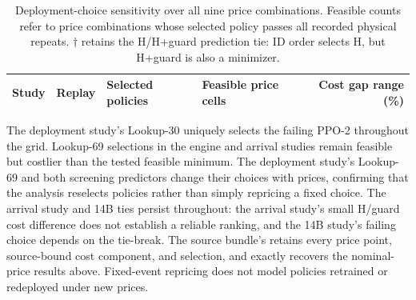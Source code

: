 \begin{table}[t]
\centering
\small
\caption{Deployment-choice sensitivity over all nine price combinations.
Feasible counts refer to price combinations whose selected policy passes all
recorded physical repeats. $\dagger$ retains the H/H+guard prediction tie:
ID order selects H, but H+guard is also a minimizer.}
\label{tab:decisionprice}
\par\vspace{4pt}
\begin{tabular*}{\linewidth}{@{\extracolsep{\fill}}llllr@{}}
\toprule
Study & Replay & Selected policies & Feasible price cells & Cost gap range (\%)\\
\midrule

\end{tabular*}
\end{table}

The deployment study's Lookup-30 uniquely selects the failing PPO-2 throughout the grid. Lookup-69 selections in the engine and arrival studies remain feasible but costlier than the tested feasible minimum.
The deployment study's Lookup-69 and both screening predictors change their choices with prices, confirming that
the analysis reselects policies rather than simply repricing a fixed choice.
The arrival study and 14B ties persist throughout: the arrival study's small H/guard cost difference does
not establish a reliable ranking, and the 14B study's failing choice depends on the
tie-break. The source bundle's  retains every
price point, source-bound cost component, and selection, and exactly recovers
the nominal-price results above. Fixed-event repricing does not model policies
retrained or redeployed under new prices.
